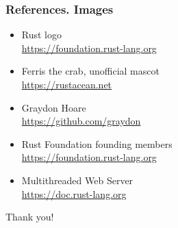 \documentclass{beamer}
\begin{document}
\begin{frame}
\frametitle{References. Images}
\begin{itemize}
\item Rust logo\\
\href{https://foundation.rust-lang.org/policies/logo-policy-and-media-guide/\#the-rust-trademarks}{https://foundation.rust-lang.org}
\item Ferris the crab, unofficial mascot\\
\href{https://rustacean.net}{https://rustacean.net}
\item Graydon Hoare\\
\href{https://github.com/graydon}{https://github.com/graydon}
\item Rust Foundation founding members\\
\href{https://foundation.rust-lang.org/members/}{https://foundation.rust-lang.org}
\item Multithreaded Web Server\\
\href{https://doc.rust-lang.org/stable/book/ch20-00-final-project-a-web-server.html}{https://doc.rust-lang.org}
\end{itemize}
\end{frame}


\begin{frame}
\Huge{\centerline{Thank you!}}
\end{frame}
\end{document}
